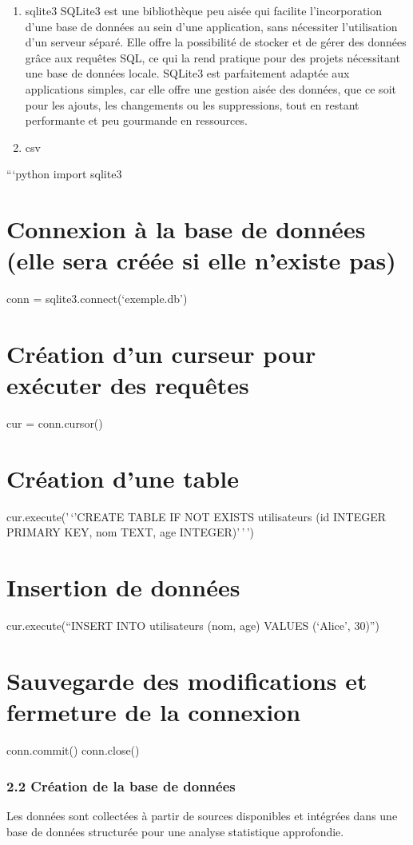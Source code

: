 \documentclass[
]{article}
\providecommand{\tightlist}{%
  \setlength{\itemsep}{0pt}\setlength{\parskip}{0pt}}
\begin{document}
\begin{enumerate}
\def\labelenumi{\arabic{enumi}.}
\tightlist
\item
  sqlite3 SQLite3 est une bibliothèque peu aisée qui facilite
  l'incorporation d'une base de données au sein d'une application, sans
  nécessiter l'utilisation d'un serveur séparé. Elle offre la
  possibilité de stocker et de gérer des données grâce aux requêtes SQL,
  ce qui la rend pratique pour des projets nécessitant une base de
  données locale. SQLite3 est parfaitement adaptée aux applications
  simples, car elle offre une gestion aisée des données, que ce soit
  pour les ajouts, les changements ou les suppressions, tout en restant
  performante et peu gourmande en ressources.
\item
  csv
\end{enumerate}

```python import sqlite3

\section{Connexion à la base de données (elle sera créée si elle
n'existe
pas)}\label{connexion-uxe0-la-base-de-donnuxe9es-elle-sera-cruxe9uxe9e-si-elle-nexiste-pas}

conn = sqlite3.connect(`exemple.db')

\section{Création d'un curseur pour exécuter des
requêtes}\label{cruxe9ation-dun-curseur-pour-exuxe9cuter-des-requuxeates}

cur = conn.cursor()

\section{Création d'une table}\label{cruxe9ation-dune-table}

cur.execute('\,`'CREATE TABLE IF NOT EXISTS utilisateurs (id INTEGER
PRIMARY KEY, nom TEXT, age INTEGER)'\,'\,')

\section{Insertion de données}\label{insertion-de-donnuxe9es}

cur.execute(``INSERT INTO utilisateurs (nom, age) VALUES (`Alice',
30)'')

\section{Sauvegarde des modifications et fermeture de la
connexion}\label{sauvegarde-des-modifications-et-fermeture-de-la-connexion}

conn.commit() conn.close()

\subsubsection{2.2 Création de la base de
données}\label{cruxe9ation-de-la-base-de-donnuxe9es}

Les données sont collectées à partir de sources disponibles et intégrées
dans une base de données structurée pour une analyse statistique
approfondie.
\end{document}
